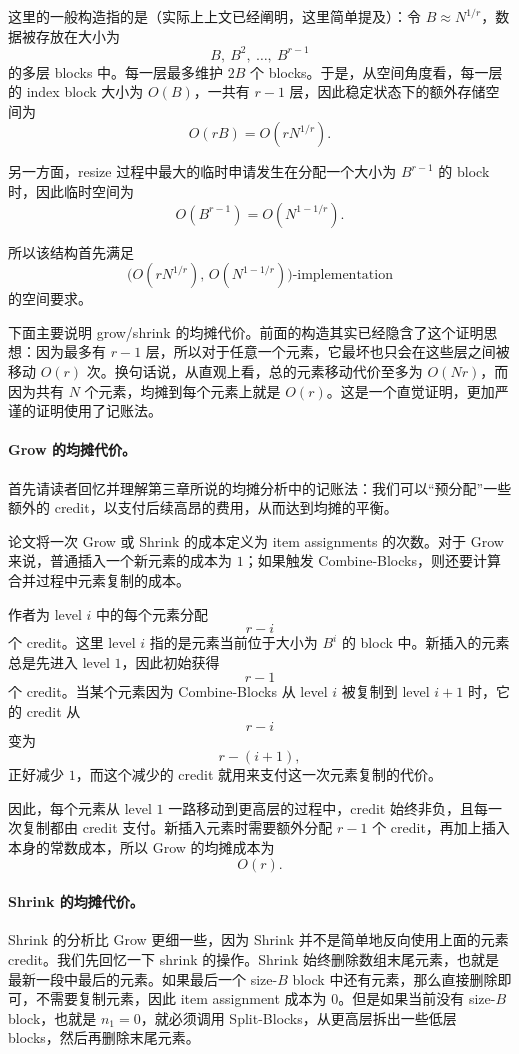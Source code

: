 \documentclass[12pt,a4paper]{article}
\begin{document}
这里的一般构造指的是（实际上上文已经阐明，这里简单提及）：令 $B\approx N^{1/r}$，数据被存放在大小为
\[
B,\ B^2,\ \ldots,\ B^{r-1}
\]
的多层 blocks 中。每一层最多维护 $2B$ 个 blocks。于是，从空间角度看，每一层的 index block 大小为 $O(B)$，一共有 $r-1$ 层，因此稳定状态下的额外存储空间为
\[
O(rB)=O(rN^{1/r}).
\]

另一方面，resize 过程中最大的临时申请发生在分配一个大小为 $B^{r-1}$ 的 block 时，因此临时空间为
\[
O(B^{r-1})=O(N^{1-1/r}).
\]

所以该结构首先满足
\[
\bigl(O(rN^{1/r}),\,O(N^{1-1/r})\bigr)\text{-implementation}
\]
的空间要求。

下面主要说明 grow/shrink 的均摊代价。前面的构造其实已经隐含了这个证明思想：因为最多有 $r-1$ 层，所以对于任意一个元素，它最坏也只会在这些层之间被移动 $O(r)$ 次。换句话说，从直观上看，总的元素移动代价至多为 $O(Nr)$，而因为共有 $N$ 个元素，均摊到每个元素上就是 $O(r)$。这是一个直觉证明，更加严谨的证明使用了记账法。

\paragraph{Grow 的均摊代价。}

首先请读者回忆并理解第三章所说的均摊分析中的记账法：我们可以“预分配”一些额外的 credit，以支付后续高昂的费用，从而达到均摊的平衡。

论文将一次 Grow 或 Shrink 的成本定义为 item assignments 的次数。对于 Grow 来说，普通插入一个新元素的成本为 $1$；如果触发 Combine-Blocks，则还要计算合并过程中元素复制的成本。

作者为 level $i$ 中的每个元素分配
\[
r-i
\]
个 credit。这里 level $i$ 指的是元素当前位于大小为 $B^i$ 的 block 中。新插入的元素总是先进入 level $1$，因此初始获得
\[
r-1
\]
个 credit。当某个元素因为 Combine-Blocks 从 level $i$ 被复制到 level $i+1$ 时，它的 credit 从
\[
r-i
\]
变为
\[
r-(i+1),
\]
正好减少 $1$，而这个减少的 credit 就用来支付这一次元素复制的代价。

因此，每个元素从 level $1$ 一路移动到更高层的过程中，credit 始终非负，且每一次复制都由 credit 支付。新插入元素时需要额外分配 $r-1$ 个 credit，再加上插入本身的常数成本，所以 Grow 的均摊成本为
\[
O(r).
\]


\paragraph{Shrink 的均摊代价。}

Shrink 的分析比 Grow 更细一些，因为 Shrink 并不是简单地反向使用上面的元素 credit。我们先回忆一下 shrink 的操作。Shrink 始终删除数组末尾元素，也就是最新一段中最后的元素。如果最后一个 size-$B$ block 中还有元素，那么直接删除即可，不需要复制元素，因此 item assignment 成本为 $0$。但是如果当前没有 size-$B$ block，也就是 $n_1=0$，就必须调用 Split-Blocks，从更高层拆出一些低层 blocks，然后再删除末尾元素。
\end{document}
